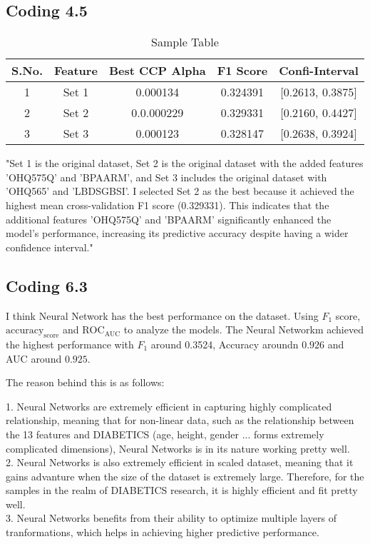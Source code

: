 \documentclass[12pt]{article}
\begin{document}
\subsection{Coding 4.5}
\begin{center}
  \begin{table}[ht]
    \centering
    \begin{tabular}{|c|c|c|c|c}
    \hline
    \textbf{S.No.} & \textbf{Feature} & \textbf{Best CCP Alpha} & \textbf{F1 Score} & \textbf{Confi-Interval}\\
    \hline
    1 & Set 1 & 0.000134 & 0.324391 & [0.2613, 0.3875] \\
    \hline
    2 & Set 2& 0.0.000229 & 0.329331 &  [0.2160, 0.4427]\\
    \hline
    3 & Set 3& 0.000123 & 0.328147 & [0.2638, 0.3924]\\
    \hline
    \end{tabular}
    \caption{Sample Table}
    \label{tab:sample_table}
    \end{table}
\end{center}
    "Set 1 is the original dataset, Set 2 is the original dataset with the added features 'OHQ575Q' and 'BPAARM', and Set 3 includes the original dataset with 'OHQ565' and 'LBDSGBSI'. I selected Set 2 as the best because it achieved the highest mean cross-validation F1 score (0.329331). This indicates that the additional features 'OHQ575Q' and 'BPAARM' significantly enhanced the model's performance, increasing its predictive accuracy despite having a wider confidence interval."
\subsection{Coding 6.3}
\begin{tcolorbox}[myblock, title = Answer]
 I think Neural Network has the best performance on the dataset. Using \(F_1\) score, \(\text{accuracy}_\text{score}\) and 
 \(\text{ROC}_\text{AUC}\) to analyze the models. The Neural Networkm achieved the highest performance with \(F_1\) around 0.3524, 
 Accuracy aroundn \(0.926 \) and AUC around \(0.925 \).

 The reason behind this is as follows:

 1. Neural Networks are extremely efficient in capturing highly complicated relationship,  meaning that for non-linear data, such as the relationship between the 13 features and DIABETICS (age, height, gender ... forms extremely complicated dimensions), Neural Networks is in its nature working pretty well. \\
 2. Neural Networks is also extremely efficient in scaled dataset, meaning that it gains advanture when the size of the dataset is extremely large. Therefore, for the samples in the realm of DIABETICS research, it is highly efficient and fit pretty well. \\
 3. Neural Networks benefits from their ability to optimize multiple layers of tranformations, which helps in achieving higher predictive performance. \\
 
\end{tcolorbox}
\end{document}
